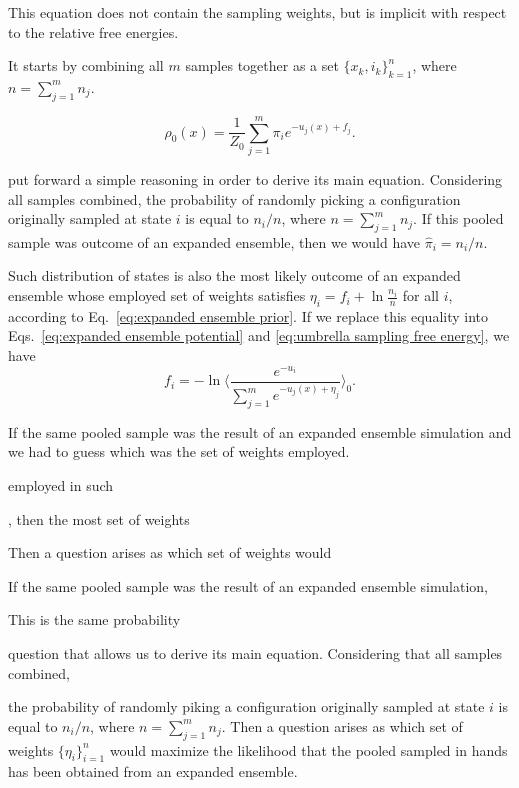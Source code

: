 \documentclass[aip,jcp,reprint,amsmath,amssymb]{revtex4-1}
\begin{document}
This equation does not contain the sampling weights, but is implicit with respect to the relative free energies.

It starts by combining all $m$ samples together as a set $\{x_k,i_k\}_{k=1}^n$, where $n = \sum_{j=1}^m n_j$.



\begin{equation}
\label{eq:mbar mixture}
\rho_0(x) = \frac{1}{Z_0} \sum_{j=1}^m \pi_i e^{-u_j(x) + f_j}.
\end{equation}


put forward a simple reasoning in order to derive its main equation. Considering all samples combined, the probability of randomly picking a configuration originally sampled at state $i$ is equal to $n_i/n$, where $n = \sum_{j=1}^m n_j$. If this pooled sample was outcome of an expanded ensemble, then we would have $\hat \pi_i = n_i/n$.


Such distribution of states is also the most likely outcome of an expanded ensemble whose employed set of weights satisfies $\eta_i = f_i + \ln\frac{n_i}{n}$ for all $i$, according to Eq.~\eqref{eq:expanded ensemble prior}. If we replace this equality into Eqs.~\eqref{eq:expanded ensemble potential} and \eqref{eq:umbrella sampling free energy}, we have
\begin{equation*}
f_i = -\ln \langle \frac{e^{-u_i}}{\sum_{j=1}^m e^{-u_j(x) + \eta_j}} \rangle_0.
\end{equation*}



If the same pooled sample was the result of an expanded ensemble simulation and we had to guess which was the set of weights employed.

 employed in such 


, then the most set of weights 



Then a question arises as which set of weights would 


If the same pooled sample was the result of an expanded ensemble simulation, 


This is the same probability 

question that allows us to derive its main equation. Considering that all samples combined, 



the probability of randomly piking a configuration originally sampled at state $i$ is equal to $n_i/n$, where $n = \sum_{j=1}^m n_j$. Then a question arises as which set of weights $\{\eta_i\}_{i=1}^n$ would maximize the likelihood that the pooled sampled in hands has been obtained from an expanded ensemble.
\end{document}
